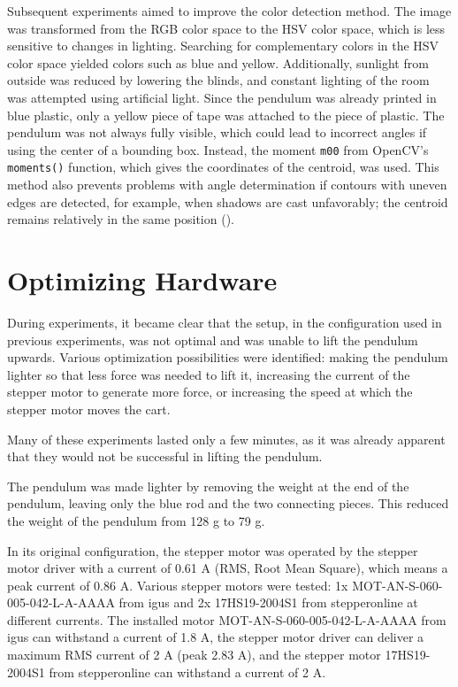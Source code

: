 Subsequent experiments aimed to improve the color detection method. The image was transformed from the RGB color space to the HSV color space, which is less sensitive to changes in lighting. Searching for complementary colors in the HSV color space yielded colors such as blue and yellow. Additionally, sunlight from outside was reduced by lowering the blinds, and constant lighting of the room was attempted using artificial light. Since the pendulum was already printed in blue plastic, only a yellow piece of tape was attached to the piece of plastic. The pendulum was not always fully visible, which could lead to incorrect angles if using the center of a bounding box. Instead, the moment \texttt{m00} from OpenCV's \texttt{moments()} function, which gives the coordinates of the centroid, was used. This method also prevents problems with angle determination if contours with uneven edges are detected, for example, when shadows are cast unfavorably; the centroid remains relatively in the same position (\cite{opencv_team_opencv_nodate-2}).

\section{Optimizing Hardware}
During experiments, it became clear that the setup, in the configuration used in previous experiments, was not optimal and was unable to lift the pendulum upwards. Various optimization possibilities were identified: making the pendulum lighter so that less force was needed to lift it, increasing the current of the stepper motor to generate more force, or increasing the speed at which the stepper motor moves the cart.

Many of these experiments lasted only a few minutes, as it was already apparent that they would not be successful in lifting the pendulum.

The pendulum was made lighter by removing the weight at the end of the pendulum, leaving only the blue rod and the two connecting pieces. This reduced the weight of the pendulum from 128 g to 79 g.

In its original configuration, the stepper motor was operated by the stepper motor driver with a current of 0.61 A (RMS, Root Mean Square), which means a peak current of 0.86 A. Various stepper motors were tested: 1x MOT-AN-S-060-005-042-L-A-AAAA from igus and 2x 17HS19-2004S1 from stepperonline at different currents. The installed motor MOT-AN-S-060-005-042-L-A-AAAA from igus can withstand a current of 1.8 A, the stepper motor driver can deliver a maximum RMS current of 2 A (peak 2.83 A), and the stepper motor 17HS19-2004S1 from stepperonline can withstand a current of 2 A.

